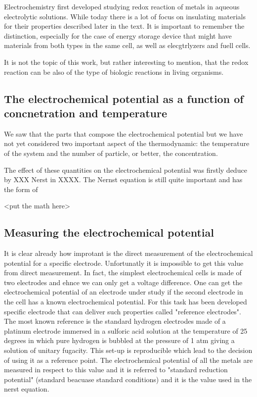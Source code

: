 Electrochemistry first developed studying redox reaction of metals in aqueous electrolytic solutions. While today there is a lot of focus on insulating materials for their properties described later in the text. It is important to remember the distinction, especially for the case of energy storage device that might have materials from both types in the same cell, as well as elecgtrlyzers and fuell cells.

It is not the topic of this work, but rather interesting to mention, that the redox reaction can be also of the type of biologic reactions in living organisms. 

\subsection{The electrochemical potential as a function of concnetration and temperature}

We saw that the parts that compose the electrochemical potential but we have not yet considered two important aspect of the thermodynamic: the temperature of the system and the number of particle, or better, the concentration.

The effect of these quantities on the electrochemical potential was firstly deduce by XXX Nerst in XXXX. The Nernst equation is still quite important and has the form of

<put the math here>

\subsection{Measuring the electrochemical potential}

It is clear already how improtant is the direct measurement of the electrochemical potential for a specific electrode. Unfortunatly it is impossible to get this value from direct measurement. In fact, the simplest electrochemical cells is made of two electrodes and ehnce we can only get a voltage difference. One can get the electrochemical potential of an electrode under study if the second electrode in the cell has a known electrochemical potential. For this task has been developed specific electrode that can deliver such properties called "reference electrodes". The most known reference is the standard hydrogen electrodes made of a platinum electrode immersed in a sulforic acid solution at the temperature of 25 degrees in which pure hydrogen is bubbled at the pressure of 1 atm giving a solution of unitary fugacity. This set-up is reproducible which lead to the decision of using it as a reference point. The electrochemical potential of all the metals are measured in respect to this value and it is referred to "standard reduction potential" (standard beacuase standard conditions) and it is the value used in the nerst equation.


